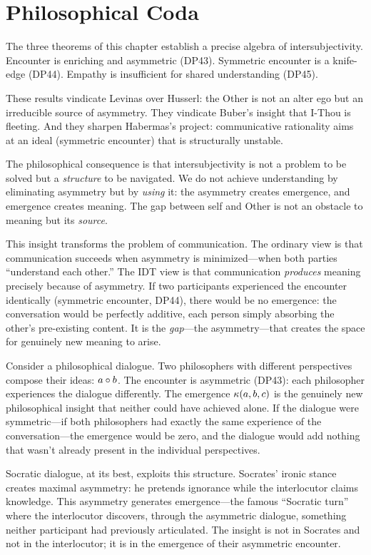 \section{Philosophical Coda}

The three theorems of this chapter establish a precise algebra of
intersubjectivity.  Encounter is enriching and asymmetric (DP43).  Symmetric
encounter is a knife-edge (DP44).  Empathy is insufficient for shared
understanding (DP45).

These results vindicate Levinas over Husserl: the Other is not an alter ego
but an irreducible source of asymmetry.  They vindicate Buber's insight that
I-Thou is fleeting.  And they sharpen Habermas's project: communicative
rationality aims at an ideal (symmetric encounter) that is structurally
unstable.

The philosophical consequence is that intersubjectivity is not a problem to
be solved but a \emph{structure} to be navigated.  We do not achieve
understanding by eliminating asymmetry but by \emph{using} it: the asymmetry
creates emergence, and emergence creates meaning.  The gap between self and
Other is not an obstacle to meaning but its \emph{source}.

This insight transforms the problem of communication.  The ordinary view is
that communication succeeds when asymmetry is minimized---when both parties
``understand each other.''  The IDT view is that communication \emph{produces}
meaning precisely because of asymmetry.  If two participants experienced the
encounter identically (symmetric encounter, DP44), there would be no emergence:
the conversation would be perfectly additive, each person simply absorbing the
other's pre-existing content.  It is the \emph{gap}---the asymmetry---that
creates the space for genuinely new meaning to arise.

Consider a philosophical dialogue.  Two philosophers with different perspectives
compose their ideas: $a \circ b$.  The encounter is asymmetric (DP43): each
philosopher experiences the dialogue differently.  The emergence
$\kappa(a, b, c)$ is the genuinely new philosophical insight that neither
could have achieved alone.  If the dialogue were symmetric---if both
philosophers had exactly the same experience of the conversation---the
emergence would be zero, and the dialogue would add nothing that wasn't
already present in the individual perspectives.

Socratic dialogue, at its best, exploits this structure.  Socrates' ironic
stance creates maximal asymmetry: he pretends ignorance while the interlocutor
claims knowledge.  This asymmetry generates emergence---the famous
``Socratic turn'' where the interlocutor discovers, through the asymmetric
dialogue, something neither participant had previously articulated.  The
insight is not in Socrates and not in the interlocutor; it is in the
emergence of their asymmetric encounter.

